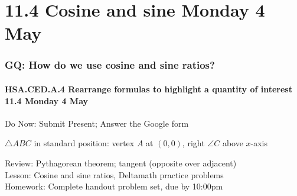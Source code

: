 \documentclass{beamer}
\begin{document}
\section{11.4 Cosine and sine Monday 4 May} 
\frame
{
  \frametitle{GQ: How do we use cosine and sine ratios?}
  \framesubtitle{HSA.CED.A.4 Rearrange formulas to highlight a quantity of interest \hfill \alert{11.4 Monday 4 May}}

  \begin{block}{Do Now: Submit Present; Answer the Google form} \vspace{0.5cm}
    \begin{multicols}{2}
      $\triangle ABC$ in standard position: vertex $A$ at $(0,0)$, right $\angle C$ above $x$-axis
  \end{multicols}
    \end{block}
    Review: Pythagorean theorem; tangent (opposite over adjacent)\\[0.25cm]
    Lesson: Cosine and sine ratios, 
    Deltamath practice problems \\[0.25cm]
    Homework: Complete handout problem set, due by 10:00pm}
\end{document}
